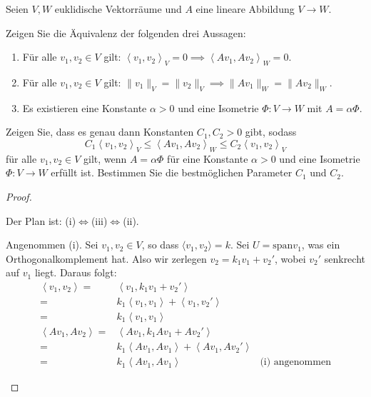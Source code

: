 \begin{Problem}
	Seien $V,W$ euklidische Vektorräume und $A$ eine lineare Abbildung $V\to W$. 
	\begin{parts}
	\item Zeigen Sie die Äquivalenz der folgenden drei Aussagen:
		\begin{enumerate}[label=\roman*.]
			\item F\"{u}r alle $v_1,v_2\in V$ gilt: $\left<v_1,v_2 \right>_V=0\implies \left<Av_1, Av_2 \right>_W=0$.
			\item F\"{u}r alle $v_1,v_2\in V$ gilt: $\|v_1\|_V=\|v_2\|_V\implies \|Av_1\|_W=\|Av_2\|_W$.
			\item Es existieren eine Konstante $\alpha>0$ und eine Isometrie $\Phi:V\to W$ mit $A=\alpha\Phi$.
		\end{enumerate}
	\item Zeigen Sie, dass es genau dann Konstanten $C_1,C_2>0$ gibt, sodass
		\[
		C_1\left<v_1,v_2 \right>_V\le \left<Av_1,Av_2 \right>_W\le C_2\left<v_1,v_2 \right>_V
	\]
	f\"{u}r alle $v_1,v_2\in V$ gilt, wenn $A=\alpha\Phi$ f\"{u}r eine Konstante $\alpha>0$ und eine Isometrie $\Phi:V\to W$ erf\"{u}llt ist. Bestimmen Sie die bestmöglichen Parameter $C_1$ und $C_2$.
	\end{parts}
\end{Problem}
\begin{proof}
	\begin{parts}
	\item Der Plan ist: (i)$\iff$(iii)$\iff$(ii).

		Angenommen (i). Sei $v_1,v_2\in V$, so dass $\langle v_1,v_2\rangle=k$. Sei $U=\text{span}v_1$, was ein Orthogonalkomplement hat. Also wir zerlegen $v_2=k_1v_1+v_2'$, wobei $v_2'$ senkrecht auf $v_1$ liegt. Daraus folgt:
		\begin{align*}
			\left<v_1,v_2 \right> =&\left<v_1,k_1 v_1+v_2' \right>\\
			=&k_1\left<v_1,v_1 \right>+\left<v_1,v_2' \right>\\
			=&k_1\left<v_1,v_1 \right>\\
			\left<Av_1,Av_2 \right> =& \left<Av_1,k_1 Av_1+Av_2' \right>\\
			=&k_1 \left<Av_1,Av_1 \right>+ \left<Av_1,Av_2' \right>\\
			=&k_1\left<Av_1,Av_1 \right> & \text{(i) angenommen}
		\end{align*}
	\end{parts}
\end{proof}
